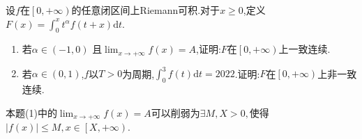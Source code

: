 \documentclass[../../main.tex]{subfiles}
\begin{document}
\begin{example}
设$f$在$\left[ 0,+\infty \right)$的任意闭区间上Riemann可积.对于$x\geqslant 0$,定义$F\left( x \right) =\int_0^x{t^{\alpha}}f\left( t+x \right) \mathrm{d}t$.
\begin{enumerate}[(1)]
\item 若$\alpha \in \left( -1,0 \right)$ 且$\lim_{x\rightarrow +\infty} f\left( x \right) =A$,证明:$F$在$\left[ 0,+\infty \right) $上一致连续.

\item 若$\alpha \in \left( 0,1 \right)$,$f$以$T>0$为周期,$\int_0^3{f\left( t \right) \mathrm{d}t}=2022$.证明:$F$在$\left[ 0,+\infty \right) $上非一致连续.
\end{enumerate}
\end{example}
\begin{note}
本题(1)中的$\lim_{x\rightarrow +\infty} f\left( x \right) =A$可以削弱为$\exists M,X>0,$使得$\left| f\left( x \right) \right|\leqslant M,x\in \left[ X,+\infty \right) $.
\end{note}
\end{document}
